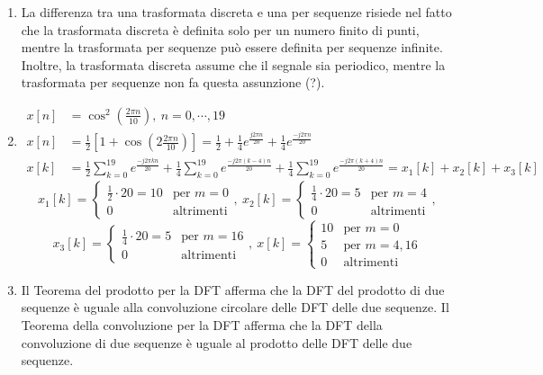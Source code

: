 \documentclass[
]{article}
\begin{document}
\begin{enumerate}
\def\labelenumi{\arabic{enumi}.}
\setcounter{enumi}{22}
\item
  La differenza tra una trasformata discreta e una per sequenze risiede
  nel fatto che la trasformata discreta è definita solo per un numero
  finito di punti, mentre la trasformata per sequenze può essere
  definita per sequenze infinite. Inoltre, la trasformata discreta
  assume che il segnale sia periodico, mentre la trasformata per
  sequenze non fa questa assunzione (?).
\item
  \begin{align*} 
  x[n] &= \cos^2(\frac{2\pi n}{10}), \ n= 0, \cdots, 19 \\
  x[n] &= \frac{1}{2}[1+\cos(2\frac{2\pi n}{10})] = \frac{1}{2} + \frac{1}{4}e^{\frac{j2\pi n}{20}} + \frac{1}{4}e^{\frac{-j2\pi n}{20}} \\
  x[k] &= \frac{1}{2}\sum_{k=0}^{19} e^{\frac{-j2\pi kn}{20}} + \frac{1}{4}\sum_{k=0}^{19} e^{\frac{-j2\pi (k-4)n}{20}} +\frac{1}{4}\sum_{k=0}^{19} e^{\frac{-j2\pi (k+4)n}{20}} = x_1[k]+x_2[k]+x_3[k]
  \end{align*} \[
  x_{1}[k] = \left\{ \begin{array}{cl}
  \frac{1}{2} \cdot 20 = 10 & \text{per } m=0 \\
  0 & \text{altrimenti}
  \end{array} \right., \
  x_{2}[k] = \left\{ \begin{array}{cl}
  \frac{1}{4} \cdot 20 = 5& \text{per } m=4 \\
  0 & \text{altrimenti}
  \end{array} \right.,
  \] \[
  x_{3}[k] = \left\{ \begin{array}{cl}
  \frac{1}{4} \cdot 20 = 5& \text{per } m=16 \\
  0 & \text{altrimenti}
  \end{array} \right.,\
  x[k] = \left\{ \begin{array}{cl}
  10& \text{per } m=0 \\
  5 & \text{per }m=4, 16\\
  0 & \text{altrimenti}
  \end{array} \right.
  \]
\item
  Il Teorema del prodotto per la DFT afferma che la DFT del prodotto di
  due sequenze è uguale alla convoluzione circolare delle DFT delle due
  sequenze. Il Teorema della convoluzione per la DFT afferma che la DFT
  della convoluzione di due sequenze è uguale al prodotto delle DFT
  delle due sequenze.

\end{enumerate}
\end{document}
